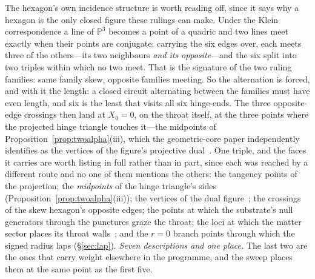 \documentclass[11pt,a4paper]{article}
\theoremstyle{definition}
\begin{document}
The hexagon's own incidence structure is worth reading off, since it says why a hexagon is the only closed
figure these rulings can make. Under the Klein correspondence a line of $\mathbb{P}^{3}$ becomes a point of a
quadric and two lines meet exactly when their points are conjugate; carrying the six edges over, each meets
three of the others---its two neighbours \emph{and its opposite}---and the six split into two triples within
which no two meet. That is the signature of the two ruling families: same family skew,
opposite families meeting. So the alternation is forced, and with it the length: a closed circuit alternating
between the families must have even length, and six is the least that visits all six hinge-ends. The three
opposite-edge crossings then land at $X_{0}=0$, on the throat itself, at the three points where the projected
hinge triangle touches it---the midpoints of Proposition~\ref{prop:twoalpha}(iii), which the geometric-core
paper independently identifies as the vertices of the figure's projective dual~\cite{JanzenGeometricCore}. One
triple, and the faces it carries are worth listing in full rather than in part, since each was reached by a
different route and no one of them mentions the others: the tangency points of the projection; the
\emph{midpoints} of the hinge triangle's sides (Proposition~\ref{prop:twoalpha}(iii)); the vertices of the dual
figure~\cite{JanzenGeometricCore}; the crossings of the skew hexagon's opposite edges; the points at which the
substrate's null generators through the punctures graze the throat; the loci at which the matter sector places
its throat walls~\cite{JanzenMatter}; and the $r=0$ branch points through which the signed radius laps
(\S\ref{sec:lap}). \emph{Seven descriptions and one place.} The last two are the ones that
carry weight elsewhere in the programme, and the sweep places them at the same point as the first five.
\end{document}

